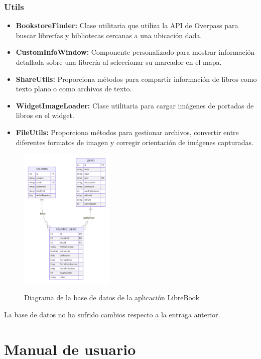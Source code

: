 \documentclass[a4paper,11pt]{report}
\begin{document}
      \subsection{Utils}
        \begin{itemize}
          \item \textbf{BookstoreFinder:} Clase utilitaria que utiliza la API de Overpass para buscar librerías y bibliotecas cercanas a una ubicación dada.
          \item \textbf{CustomInfoWindow:} Componente personalizado para mostrar información detallada sobre una librería al seleccionar su marcador en el mapa.
          \item \textbf{ShareUtils:} Proporciona métodos para compartir información de libros como texto plano o como archivos de texto.
          \item \textbf{WidgetImageLoader:} Clase utilitaria para cargar imágenes de portadas de libros en el widget.
          \item \textbf{FileUtils:} Proporciona métodos para gestionar archivos, convertir entre diferentes formatos de imagen y corregir orientación de imágenes capturadas.
        \end{itemize}
      \begin{figure}[H]
        \centering
        \href{https://raw.githubusercontent.com/Xabierland/DAS-Proyecto/refs/heads/main/Documentation/Memoria2/.img/diagrama-bd.svg}{%
          \includegraphics[width=0.4\textwidth]{.img/diagrama-bd.png}
        }
        \caption{Diagrama de la base de datos de la aplicación LibreBook}
        \label{fig:diagrama-bd}
      \end{figure}
      La base de datos no ha sufrido cambios respecto a la entraga anterior.
  \chapter{Manual de usuario}
\end{document}
